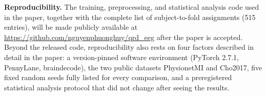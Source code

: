 \textbf{Reproducibility.} The training, preprocessing, and
statistical analysis code used in the paper, together with the
complete list of subject-to-fold assignments (515 entries), will be
made publicly available at
\url{https://github.com/nguyenphuonghuy/qrd_eeg} after the paper is
accepted. Beyond the released code, reproducibility also rests on
four factors
described in detail in the paper: a version-pinned software
environment (PyTorch 2.7.1, PennyLane, braindecode), the two public
datasets PhysionetMI and Cho2017, five fixed random seeds fully
listed for every comparison, and a preregistered statistical
analysis protocol that did not change after seeing the results.

